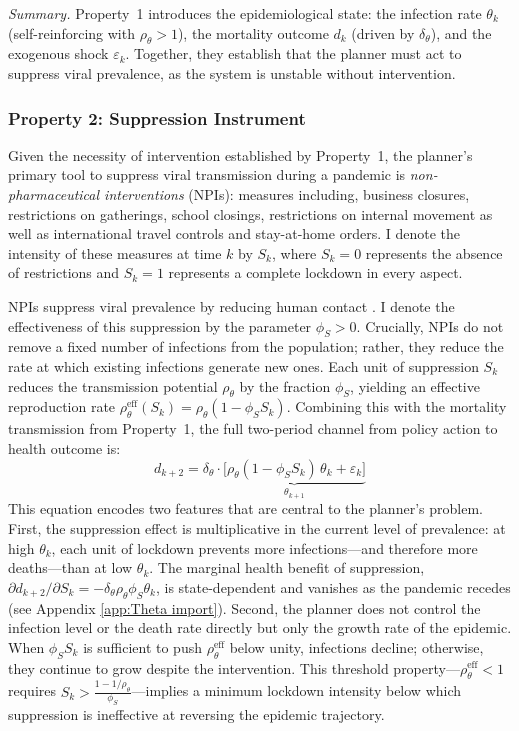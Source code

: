 \documentclass[12pt, a4paper]{article}
\newcommand{\Sk}{S_k}
\begin{document}
\medskip
\noindent\textit{Summary.} Property~1 introduces the epidemiological state: the infection rate $\theta_k$ (self-reinforcing with $\rho_\theta > 1$), the mortality outcome $d_k$ (driven by $\delta_\theta$), and the exogenous shock $\varepsilon_k$. Together, they establish that the planner must act to suppress viral prevalence, as the system is unstable without intervention.


\subsubsection*{Property 2: Suppression Instrument}
Given the necessity of intervention established by Property~1, the planner's primary tool to suppress viral transmission during a pandemic is \textit{non-pharmaceutical interventions} (NPIs): measures including, business closures, restrictions on gatherings, school closings, restrictions on internal movement as well as international travel controls and stay-at-home orders. I denote the intensity of these measures at time $k$ by $\Sk$, where $\Sk = 0$ represents the absence of restrictions and $\Sk = 1$ represents a complete lockdown in every aspect. 


NPIs suppress viral prevalence by reducing human contact \citep{Flaxman2020}. I denote the effectiveness of this suppression by the parameter $\phi_S > 0$. Crucially, NPIs do not remove a fixed number of infections from the population; rather, they reduce the rate at which existing infections generate new ones. Each unit of suppression $S_k$ reduces the transmission potential $\rho_\theta$ by the fraction $\phi_S$, yielding an effective reproduction rate $\rho_\theta^{\text{eff}}(S_k) = \rho_\theta(1 - \phi_S S_k)$. Combining this with the mortality transmission from Property~1, the full two-period channel from policy action to health outcome is:
%
\begin{equation}
    d_{k+2} = \delta_\theta \cdot \underbrace{\bigl[\rho_\theta (1 - \phi_S S_k) \, \theta_k + \varepsilon_k\bigr]}_{\theta_{k+1}} 
    \label{eq:excess dynamics}
\end{equation}
%
This equation encodes two features that are central to the planner's problem. First, the suppression effect is multiplicative in the current level of prevalence: at high $\theta_k$, each unit of lockdown prevents more infections---and therefore more deaths---than at low $\theta_k$. The marginal health benefit of suppression, $\partial d_{k+2} / \partial S_k = -\delta_\theta \rho_\theta \phi_S \theta_k$, is state-dependent and vanishes as the pandemic recedes (see Appendix \ref{app:Theta import}). Second, the planner does not control the infection level or the death rate directly but only the growth rate of the epidemic. When $\phi_S S_k$ is sufficient to push $\rho_\theta^{\text{eff}}$ below unity, infections decline; otherwise, they continue to grow despite the intervention. This threshold property---$\rho_\theta^{\text{eff}} < 1$ requires $S_k > \frac{1 - 1/\rho_\theta}{\phi_S}$---implies a minimum lockdown intensity below which suppression is ineffective at reversing the epidemic trajectory.
\end{document}
